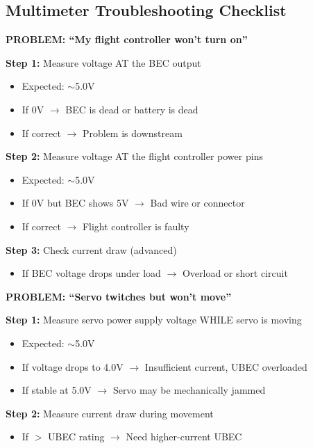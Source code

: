 \documentclass[11pt,letterpaper]{article}
\begin{document}
\subsection{Multimeter Troubleshooting Checklist}

\textbf{PROBLEM: ``My flight controller won't turn on''}

\textbf{Step 1:} Measure voltage AT the BEC output
\begin{itemize}[nosep]
\item Expected: $\sim$5.0V
\item If 0V $\rightarrow$ BEC is dead or battery is dead
\item If correct $\rightarrow$ Problem is downstream
\end{itemize}

\textbf{Step 2:} Measure voltage AT the flight controller power pins
\begin{itemize}[nosep]
\item Expected: $\sim$5.0V
\item If 0V but BEC shows 5V $\rightarrow$ Bad wire or connector
\item If correct $\rightarrow$ Flight controller is faulty
\end{itemize}

\textbf{Step 3:} Check current draw (advanced)
\begin{itemize}[nosep]
\item If BEC voltage drops under load $\rightarrow$ Overload or short circuit
\end{itemize}

\vspace{1em}

\textbf{PROBLEM: ``Servo twitches but won't move''}

\textbf{Step 1:} Measure servo power supply voltage WHILE servo is moving
\begin{itemize}[nosep]
\item Expected: $\sim$5.0V
\item If voltage drops to 4.0V $\rightarrow$ Insufficient current, UBEC overloaded
\item If stable at 5.0V $\rightarrow$ Servo may be mechanically jammed
\end{itemize}

\textbf{Step 2:} Measure current draw during movement
\begin{itemize}[nosep]
\item If $>$ UBEC rating $\rightarrow$ Need higher-current UBEC
\end{itemize}
\end{document}
